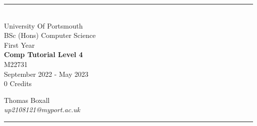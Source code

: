 \documentclass[a4paper, 11pt]{report}
\begin{document}
\begin{titlepage}
    \rule{\textwidth}{1px}
    \vspace{0.025\textheight}\\
    \huge{University Of Portsmouth}\\
    \huge{BSc (Hons) Computer Science}\\
    \huge{First Year}\\
    \vfill
    \LARGE{\textbf{Comp Tutorial Level 4}}\\
    \Large{M22731}\\
    \large{September 2022 - May 2023}\\
    \large{0 Credits}
    \vfill

    
    \begin{FlushRight}
        \large{Thomas Boxall}\\
        \textit{up2108121@myport.ac.uk}\\
        
    \end{FlushRight}
    \vspace{0.2\textheight}
    \rule{\textwidth}{1px}
    
\end{titlepage}

\tableofcontents



\end{document}
